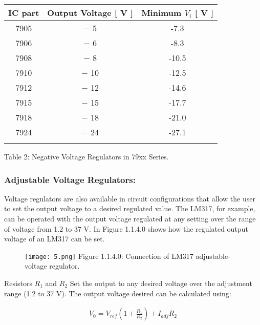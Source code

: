\begin{center}
\begin{tabular}[.5cm]{c c c}
\toprule
IC part & Output Voltage [ V ] & Minimum $V_{i}$ [ V ] \\
\midrule
7905 & $-$ 5 & -7.3 \\
\cmidrule{1-3}
7906 & $-$ 6 & -8.3 \\
\cmidrule{1-3}
7908 & $-$ 8 & -10.5 \\
\cmidrule{1-3}
7910 & $-$ 10 & -12.5 \\
\cmidrule{1-3}
7912 & $-$ 12 & -14.6 \\
\cmidrule{1-3}
7915 & $-$ 15 & -17.7 \\
\cmidrule{1-3}
7918 & $-$ 18 & -21.0 \\
\cmidrule{1-3}
7924 & $-$ 24 & -27.1 \\
\bottomrule
\linebreak
\end{tabular}
\linebreak Table 2: Negative Voltage Regulators in 79xx Series.
\end{center}

\subsubsection{Adjustable Voltage Regulators:}

Voltage regulators are also available in circuit configurations that allow the user to set the output voltage to a desired regulated value. The LM317, for example, can be operated with the output voltage regulated at any setting over the range of voltage from 1.2 to 37 V. In Figure 1.1.4.0 shows how the regulated output voltage of an LM317 can be set. \hfill \break

\begin{multicols}{2}
\begin{figure}[H]
\texttt{[image: 5.png]}
\centering \linebreak \linebreak Figure 1.1.4.0: Connection of LM317 adjustable-voltage regulator.
\end{figure} \hfill \break \break \break \break

Resistors $R_{1}$ and $R_{2}$ Set the output to any desired voltage over the adjustment range (1.2 to 37 V). The output voltage desired can be calculated using: \hfill

\begin{ceqn}
\begin{align}
V_{0} = V_{ref}( 1 + \frac{R_{1}}{R_{2}} ) + I_{adj} R_{2}
\end{align}
\end{ceqn} \hfill

\end{multicols}

\pagebreak
